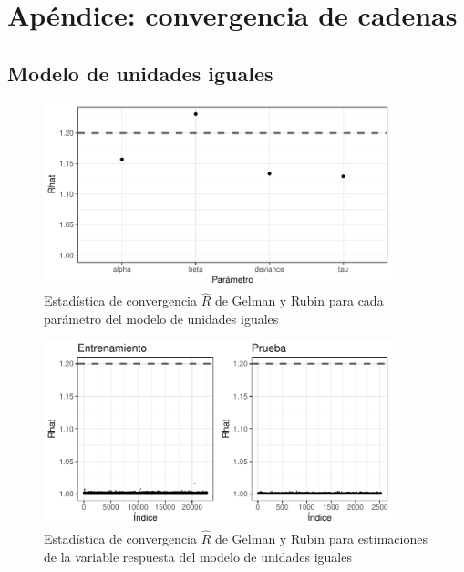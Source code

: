 
\section*{Apéndice: convergencia de cadenas}
\label{sec:appendix}


\subsection*{Modelo de unidades iguales}

\begin{figure}[H]
    \centering
    \includegraphics[width=0.9\textwidth]{images/comp_pooling_r_statistic_params.pdf}
    \caption{Estadística de convergencia $\hat{R}$ de Gelman y Rubin para cada parámetro del modelo de unidades iguales}
    \label{fig:comp_pooling_r_statistic_params}
\end{figure}

\begin{figure}[H]
    \centering
    \includegraphics[width=0.9\textwidth]{images/comp_pooling_r_statistic_yf.pdf}
    \caption{Estadística de convergencia $\hat{R}$ de Gelman y Rubin para estimaciones de la variable respuesta del modelo de unidades iguales}
    \label{fig:comp_pooling_r_statistic_yf}
\end{figure}

